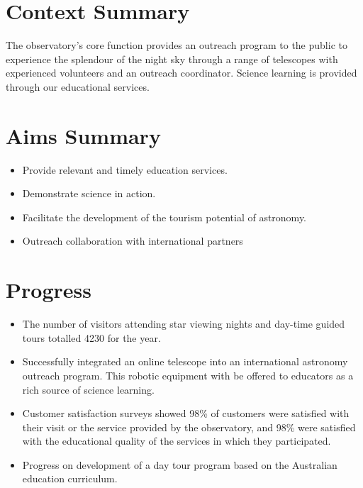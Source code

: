 \documentclass[version=last, paper=a4, DIV=18, usenames, dvipsnames]{scrartcl}
\begin{document}
\section{Context Summary}



The observatory's core function provides an outreach program to the public to experience the splendour of the night sky through a range of telescopes with experienced volunteers and an outreach coordinator. Science learning is provided through our educational services.






\section{Aims Summary}



\begin{itemize}

  \item Provide relevant and timely education services.

  \item Demonstrate science in action.

  \item Facilitate the development of the tourism potential of astronomy.

  \item Outreach collaboration with international partners

\end{itemize}






\section{Progress}



\begin{itemize}

  \item The number of visitors attending star viewing nights and day-time guided tours totalled 4230 for the year.

  \item Successfully integrated an online telescope into an international astronomy outreach program. This robotic equipment with be offered to educators as a rich source of science learning.

  \item Customer satisfaction surveys showed 98\% of customers were satisfied with their visit or the service provided by the observatory, and 98\% were satisfied with the educational quality of the services in which they participated.

  \item Progress on development of a day tour program based on the Australian education curriculum.

\end{itemize}
\end{document}
